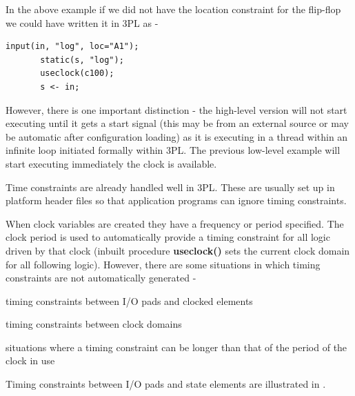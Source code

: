     In the above example if we did not have the location constraint for the
    flip-flop we could have written it in 3PL as -
    \begin{lstlisting}[gobble=4, language=threepl]
       input(in, "log", loc="A1");
       static(s, "log");
       useclock(c100);
       s <- in;
    \end{lstlisting}
    However, there is one important distinction - the high-level version will
    not start executing until it gets a start signal (this may be from an
    external source or may be automatic after configuration loading) as it is
    executing in a thread within an infinite loop initiated formally within 3PL.
    The previous low-level example will start executing immediately the clock is
    available.    
    
    Time constraints are already handled well in 3PL. These are usually set
    up in platform header files so that application programs can ignore
    timing constraints.
    
    When clock variables are created they have a frequency or period specified.
    The clock period is used to automatically provide a timing constraint for
    all logic driven by that clock (inbuilt procedure {\bf useclock()} sets the
    current clock domain for all following logic). However, there are some
    situations in which timing constraints are not automatically generated -
    \blist
    \item   timing constraints between I/O pads and clocked elements
    \item   timing constraints between clock domains
    \item   situations where a timing constraint can be longer than that of
            the period of the clock in use
    \blend
    
    Timing constraints between I/O pads and state elements are illustrated
    in .

